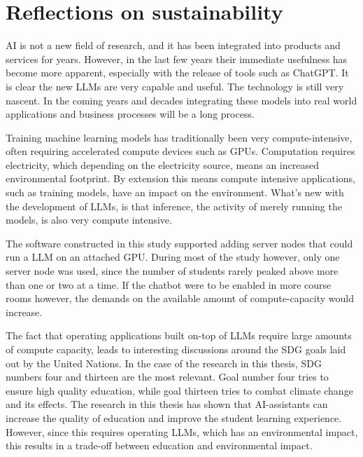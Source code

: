 \section{Reflections on sustainability}
\label{sec:reflections}




AI is not a new field of research, and it has been integrated into products and services for years. However, in the last few years their immediate usefulness has become more apparent, especially with the release of tools such as ChatGPT. It is clear the new \gls{LLM}s are very capable and useful. The technology is still very nascent. In the coming years and decades integrating these models into real world applications and business processes will be a long process.


Training machine learning models has traditionally been very compute-intensive, often requiring accelerated compute devices such as GPUs. Computation requires electricity, which depending on the electricity source, means an increased environmental footprint. By extension this means compute intensive applications, such as training models, have an impact on the environment. What’s new with the development of \gls{LLM}s, is that inference, the activity of merely running the models, is also very compute intensive.


The software constructed in this study supported adding server nodes that could run a \gls{LLM} on an attached GPU. During most of the study however, only one server node was used, since the number of students rarely peaked above more than one or two at a time. If the chatbot were to be enabled in more course rooms however, the demands on the available amount of compute-capacity would increase.


The fact that operating applications built on-top of \gls{LLM}s require large amounts of compute capacity, leads to interesting discussions around the \gls{SDG} goals laid out by the United Nations. In the case of the research in this thesis, \gls{SDG} numbers four and thirteen are the most relevant. Goal number four tries to ensure high quality education, while goal thirteen tries to combat climate change and its effects. The research in this thesis has shown that AI-assistants can increase the quality of education and improve the student learning experience. However, since this requires operating \gls{LLM}s, which has an environmental impact, this results in a trade-off between education and environmental impact.


